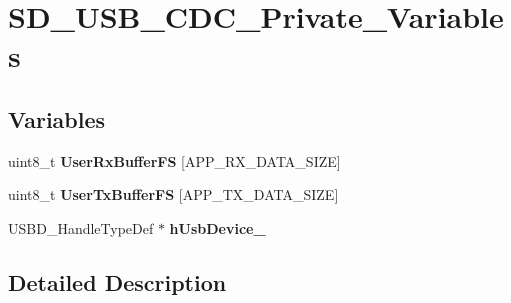 \hypertarget{group___s_d___u_s_b___c_d_c___private___variables}{}\section{S\+D\+\_\+\+U\+S\+B\+\_\+\+C\+D\+C\+\_\+\+Private\+\_\+\+Variables}
\label{group___s_d___u_s_b___c_d_c___private___variables}
\subsection*{Variables}
\begin{DoxyCompactItemize}
\item 
\mbox{\label{group___s_d___u_s_b___c_d_c___private___variables_ga1e37e6616e6affe5acf9c0befd063f6a}} 
uint8\+\_\+t {\bfseries User\+Rx\+Buffer\+FS} \mbox{[}A\+P\+P\+\_\+\+R\+X\+\_\+\+D\+A\+T\+A\+\_\+\+S\+I\+ZE\mbox{]}
\item 
\mbox{\label{group___s_d___u_s_b___c_d_c___private___variables_gad48fea85cdb7aed49bf62140a52f23e0}} 
uint8\+\_\+t {\bfseries User\+Tx\+Buffer\+FS} \mbox{[}A\+P\+P\+\_\+\+T\+X\+\_\+\+D\+A\+T\+A\+\_\+\+S\+I\+ZE\mbox{]}
\item 
\mbox{\label{group___s_d___u_s_b___c_d_c___private___variables_ga8f5d7aa91032b206b244ccebb8fbf129}} 
U\+S\+B\+D\+\_\+\+Handle\+Type\+Def $\ast$ {\bfseries h\+Usb\+Device\+\_}
\end{DoxyCompactItemize}


\subsection{Detailed Description}
